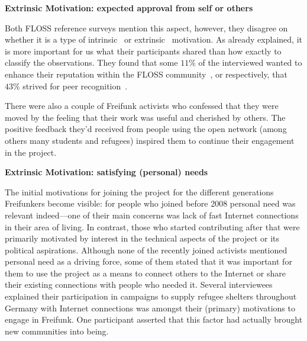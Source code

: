 \textbf{Extrinsic Motivation: expected approval from self or others}

Both FLOSS reference surveys mention this aspect, however, they disagree on whether it is a type of intrinsic~\cite{LakWo2005} or extrinsic~\cite{HarOu2002} motivation.
As already explained, it is more important for us what their participants shared than how exactly to classify the observations.
They found that some $11\%$ of the interviewed wanted to enhance their reputation within the FLOSS community~\cite{LakWo2005}, or respectively, that $43\%$ strived for peer recognition~\cite{HarOu2002}.

There were also a couple of Freifunk activists who confessed that they were moved by the feeling that their work was useful and cherished by others.
The positive feedback they'd received from people using the open network (among others many students and refugees) inspired them to continue their engagement in the project.


\textbf{Extrinsic Motivation: satisfying (personal) needs}

The initial motivations for joining the project for the different generations Freifunkers become visible:
for people who joined before 2008 personal need was relevant indeed---one of their main concerns was lack of fast Internet connections in their area of living.
In contrast, those who started contributing after that were primarily motivated by interest in the technical aspects of the project or its political aspirations.
Although none of the recently joined activists mentioned personal need as a driving force,
some of them stated that it was important for them to use the project as a means to connect others to the Internet or share their existing connections with people who needed it.
Several interviewees explained their participation in campaigns to supply refugee shelters throughout Germany with Internet connections was amongst their (primary) motivations to engage in Freifunk.
One participant asserted that this factor had actually brought new communities into being.

